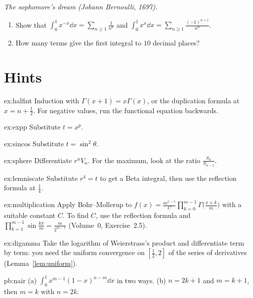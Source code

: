 \begin{exercise}[$\star$]\label{pb:sophomore}
\emph{The sophomore's dream (Johann Bernoulli, 1697).}
\begin{enumerate}[label=(\alph*)]
\item Show that $\displaystyle\int_0^1x^{-x}\dd x=\sum_{n\ge1}\frac1{n^n}$ and $\displaystyle\int_0^1x^x\dd x=\sum_{n\ge1}\frac{(-1)^{n+1}}{n^n}$.
\item How many terms give the first integral to $10$ decimal places?
\end{enumerate}
\end{exercise}

\section{Hints}

\begin{hint}{ex:halfint}
Induction with $\Gamma(x+1)=x\Gamma(x)$, or the duplication formula at $x=n+\frac12$. For negative values, run the functional equation
backwards.
\end{hint}
\begin{hint}{ex:expp}
Substitute $t=x^p$.
\end{hint}
\begin{hint}{ex:sincos}
Substitute $t=\sin^2\theta$.
\end{hint}
\begin{hint}{ex:sphere}
Differentiate $r^nV_n$. For the maximum, look at the ratio $\frac{S_n}{S_{n-1}}$.
\end{hint}
\begin{hint}{ex:lemniscate}
Substitute $r^4=t$ to get a Beta integral, then use the reflection formula at $\frac14$.
\end{hint}
\begin{hint}{ex:multiplication}
Apply Bohr--Mollerup to $f(x)=\frac{m^{x-1}}C\prod_{k=0}^{m-1}\Gamma\bigl(\frac{x+k}m\bigr)$ with a suitable constant $C$. To find $C$, use
the reflection formula and $\prod_{k=1}^{m-1}\sin\frac{k\pi}m=\frac m{2^{m-1}}$ (Volume~0, Exercise~2.5).
\end{hint}
\begin{hint}{ex:digamma}
Take the logarithm of Weierstrass's product and differentiate term by term: you need the uniform convergence on $[\frac12,2]$
of the series of derivatives (Lemma~\ref{lem:uniform}).
\end{hint}

\begin{hint}{pb:nair}
(a) $\int_0^1x^{m-1}(1-x)^{n-m}\dd x$ in two ways. (b) $n=2k+1$ and $m=k+1$, then $m=k$ with $n=2k$.
\end{hint}

